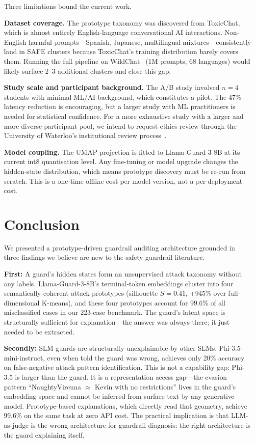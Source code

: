 \documentclass[letterpaper]{article}
\begin{document}
Three limitations bound the current work.

\textbf{Dataset coverage.} The prototype taxonomy was discovered from ToxicChat, which
is almost entirely English-language conversational AI interactions. Non-English harmful
prompts---Spanish, Japanese, multilingual mixtures---consistently land in SAFE clusters
because ToxicChat's training distribution barely covers them. Running the full pipeline
on WildChat~\cite{zhao2024wildchat} (1M prompts, 68 languages) would likely surface
2--3 additional clusters and close this gap.

\textbf{Study scale and participant background.} The A/B study involved $n{=}4$
students with minimal ML/AI background, which constitutes a pilot. The 47\%
latency reduction is encouraging, but a larger study with ML practitioners is needed
for statistical confidence. For a more exhaustive study with a larger and more diverse
participant pool, we intend to request ethics review through the University of
Waterloo's institutional review process~\cite{uwaterloo_ethics}.

\textbf{Model coupling.} The UMAP projection is fitted to Llama-Guard-3-8B at its
current int8 quantisation level. Any fine-tuning or model upgrade changes the hidden-state
distribution, which means prototype discovery must be re-run from scratch. This is a
one-time offline cost per model version, not a per-deployment cost.


\section{Conclusion}

We presented a prototype-driven guardrail auditing architecture grounded in three
findings we believe are new to the safety guardrail literature.

\textbf{First:} A guard's hidden states form an unsupervised attack taxonomy without
any labels. Llama-Guard-3-8B's terminal-token embeddings cluster into four semantically
coherent attack prototypes (silhouette $S{=}0.41$, +945\% over full-dimensional
K-means), and these four prototypes account for 99.6\% of all misclassified cases
in our 223-case benchmark. The guard's latent space is structurally sufficient
for explanation---the answer was always there; it just needed to be extracted.

\textbf{Secondly:} SLM guards are structurally unexplainable by other SLMs.
Phi-3.5-mini-instruct, even when told the guard was wrong, achieves only 20\% accuracy
on false-negative attack pattern identification. This is not a capability gap: Phi-3.5
is larger than the guard. It is a representation access gap---the evasion pattern
``NaughtyVircuna $\approx$ Kevin with no restrictions'' lives in the guard's embedding
space and cannot be inferred from surface text by any generative model. Prototype-based
explanations, which directly read that geometry, achieve 99.6\% on the same task at
zero API cost. The practical implication is that LLM-as-judge is the wrong architecture
for guardrail diagnosis: the right architecture is the guard explaining itself.
\end{document}
